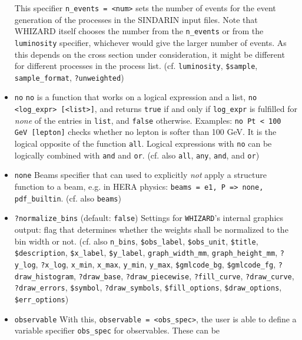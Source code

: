 \documentclass[12pt]{book}
\newcommand{\ttt}[1]{\texttt{#1}}
\newcommand{\whizard}{\texttt{WHIZARD}}
\begin{document}
\begin{itemize}
This specifier \ttt{n\_events = <num>} sets the number of events
for the event generation of the processes in the SINDARIN input
files. Note that WHIZARD itself chooses the number from the
\ttt{n\_events} or from the \ttt{luminosity} specifier, whichever
would give the larger number of events. As this depends on the cross
section under consideration, it might be different for different
processes in the process list.  (cf. \ttt{luminosity}, \ttt{\$sample},
\ttt{sample\_format}, \ttt{?unweighted}) 
\item
\ttt{no} \newline
\ttt{no} is a function that works on a logical expression and a list, 
\ttt{no <log\_expr> [<list>]}, and returns \ttt{true} if and only if
\ttt{log\_expr} is fulfilled for {\em none} of the entries in
\ttt{list}, and \ttt{false} otherwise. Examples: \ttt{no Pt < 100 GeV
  [lepton]} checks whether no lepton is softer than 100 GeV. It is the
logical opposite of the function \ttt{all}. Logical expressions with
\ttt{no} can be logically combined with \ttt{and} and
\ttt{or}. (cf. also \ttt{all}, \ttt{any}, \ttt{and}, and \ttt{or}) 
\item
\ttt{none} \newline
Beams specifier that can used to explicitly {\em not} apply a
structure function to a beam, e.g. in HERA physics: \ttt{beams = e1, P
  => none, pdf\_builtin}. (cf. also \ttt{beams})
\item
\ttt{?normalize\_bins} \qquad (default: \ttt{false}) \newline
Settings for \whizard's internal graphics output: flag that determines
whether the weights shall be normalized to the bin width or not. (cf. also
\ttt{n\_bins}, \ttt{\$obs\_label}, \ttt{\$obs\_unit},
\ttt{\$title}, \ttt{\$description}, \ttt{\$x\_label},
\ttt{\$y\_label}, \ttt{graph\_width\_mm}, \ttt{graph\_height\_mm},
\ttt{?y\_log}, \ttt{?x\_log}, \ttt{x\_min}, \ttt{x\_max},
\ttt{y\_min}, \ttt{y\_max}, \ttt{\$gmlcode\_bg}, \ttt{\$gmlcode\_fg},
\ttt{?draw\_histogram}, \newline \ttt{?draw\_base}, \ttt{?draw\_piecewise},
\ttt{?fill\_curve}, \ttt{?draw\_curve}, \ttt{?draw\_errors}, \ttt{\$symbol}, 
\newline \ttt{?draw\_symbols}, \ttt{\$fill\_options}, \ttt{\$draw\_options},
\ttt{\$err\_options})
\item
\ttt{observable} \newline
With this, \ttt{observable = <obs\_spec>}, the user is able to define
a variable specifier \ttt{obs\_spec} for observables. These can be

\end{itemize}
\end{document}
